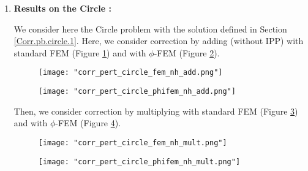 \begin{enumerate}[label=\textbullet]
	\item \textbf{Results on the Circle :}
	
	We consider here the Circle problem with the solution defined in Section \ref{Corr.pb.circle.1}. Here, we consider correction by adding (without IPP) with standard FEM (Figure \ref{corr_pert_circle_fem_nh_add}) and with $\phi$-FEM (Figure \ref{corr_pert_circle_phifem_nh_add}).
	
	\begin{minipage}{0.48\linewidth}
		\begin{figure}[H]
			\centering
			\texttt{[image: "corr\_pert\_circle\_fem\_nh\_add.png"]}
			\label{corr_pert_circle_fem_nh_add}
		\end{figure} 
	\end{minipage}
	\begin{minipage}{0.48\linewidth}
		\begin{figure}[H]
			\centering
			\texttt{[image: "corr\_pert\_circle\_phifem\_nh\_add.png"]}
			\label{corr_pert_circle_phifem_nh_add}
		\end{figure} 
	\end{minipage}
	
	Then, we consider correction by multiplying with standard FEM (Figure \ref{corr_pert_circle_fem_nh_mult}) and with $\phi$-FEM (Figure \ref{corr_pert_circle_phifem_nh_mult}).
	
	\begin{minipage}{0.48\linewidth}
		\begin{figure}[H]
			\centering
			\texttt{[image: "corr\_pert\_circle\_fem\_nh\_mult.png"]}
			\label{corr_pert_circle_fem_nh_mult}
		\end{figure} 
	\end{minipage}
	\begin{minipage}{0.48\linewidth}
		\begin{figure}[H]
			\centering
			\texttt{[image: "corr\_pert\_circle\_phifem\_nh\_mult.png"]}
			\label{corr_pert_circle_phifem_nh_mult}
		\end{figure} 
	\end{minipage}
	

\end{enumerate}
